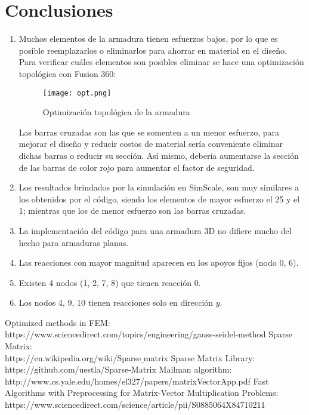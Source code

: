 \documentclass[12pt,a3paper]{article}
\begin{document}
\section{Conclusiones}
\begin{enumerate}
\item Muchos elementos de la armadura tienen esfuerzos bajos, por lo que es posible reemplazarlos o eliminarlos para ahorrar en material en el diseño. Para verificar cuáles elementos son posibles eliminar se hace una optimización topológica con Fusion 360:
\begin{figure}[H]
    \centering
    \texttt{[image: opt.png]}
    \caption{Optimización topológica de la armadura}
\end{figure}
Las barras cruzadas son las que se somenten a un menor esfuerzo, para mejorar el diseño y reducir costos de material sería conveniente eliminar dichas barras o reducir su sección. Así mismo, debería aumentarse la sección de las barras de color rojo para aumentar el factor de seguridad.
\item Los resultados brindados por la simulación en SimScale, son muy similares a los obtenidos por el código, siendo los elementos de mayor esfuerzo el 25 y el 1; mientras que los de menor esfuerzo son las barras cruzadas.
\item La implementación del código para una armadura 3D no difiere mucho del hecho para armaduras planas.
\item Las reacciones con mayor magnitud aparecen en los apoyos fijos (nodo 0, 6).
\item Existen 4 nodos (1, 2, 7, 8) que tienen reacción 0.
\item Los nodos 4, 9, 10 tienen reacciones solo en dirección $y$.
\end{enumerate}
\begin{thebibliography}{9}
 Optimized methods in FEM:\\
https://www.sciencedirect.com/topics/engineering/gauss-seidel-method
Sparse Matrix:\\
https://en.wikipedia.org/wiki/Sparse$\_$matrix
Sparse Matrix Library:\\
https://github.com/uestla/Sparse-Matrix
Mailman algorithm:\\
http://www.cs.yale.edu/homes/el327/papers/matrixVectorApp.pdf
Fast Algorithms with Preprocessing for Matrix-Vector Multiplication Problems:\\
https://www.sciencedirect.com/science/article/pii/S0885064X84710211
\end{thebibliography}
\end{document}
